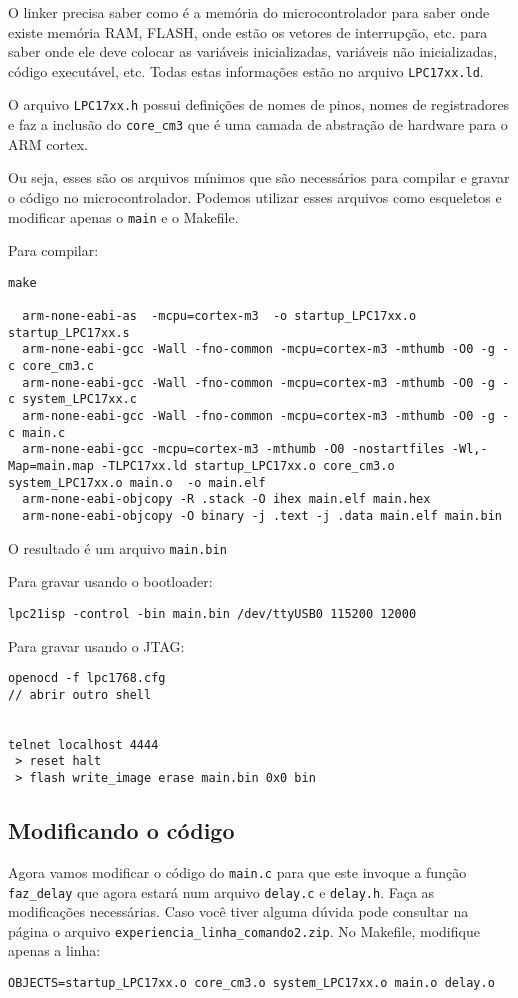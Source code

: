 \documentclass[a4paper,10pt]{article}
\begin{document}
O linker precisa saber como é a memória do microcontrolador para saber onde existe memória RAM, FLASH, onde estão os vetores de interrupção, etc. para saber onde ele deve colocar as variáveis inicializadas, variáveis não inicializadas, código executável, etc.  Todas estas informações estão no arquivo \verb|LPC17xx.ld|.



O arquivo \verb|LPC17xx.h| possui definições de nomes de pinos, nomes de registradores e faz a inclusão do \verb|core_cm3| que é uma camada de abstração de hardware para o ARM cortex.


Ou seja, esses são os arquivos mínimos que são necessários para compilar e gravar o código no microcontrolador. Podemos utilizar esses arquivos como esqueletos e modificar apenas o \verb|main| e o Makefile.

Para compilar:
\begin{lstlisting}
make

  arm-none-eabi-as  -mcpu=cortex-m3  -o startup_LPC17xx.o startup_LPC17xx.s
  arm-none-eabi-gcc -Wall -fno-common -mcpu=cortex-m3 -mthumb -O0 -g -c core_cm3.c
  arm-none-eabi-gcc -Wall -fno-common -mcpu=cortex-m3 -mthumb -O0 -g -c system_LPC17xx.c
  arm-none-eabi-gcc -Wall -fno-common -mcpu=cortex-m3 -mthumb -O0 -g -c main.c
  arm-none-eabi-gcc -mcpu=cortex-m3 -mthumb -O0 -nostartfiles -Wl,-Map=main.map -TLPC17xx.ld startup_LPC17xx.o core_cm3.o system_LPC17xx.o main.o  -o main.elf
  arm-none-eabi-objcopy -R .stack -O ihex main.elf main.hex
  arm-none-eabi-objcopy -O binary -j .text -j .data main.elf main.bin
\end{lstlisting}

O resultado é um arquivo \verb|main.bin|



Para gravar usando o bootloader:
\begin{lstlisting}
lpc21isp -control -bin main.bin /dev/ttyUSB0 115200 12000
\end{lstlisting}

Para gravar usando o JTAG:
\begin{lstlisting}
openocd -f lpc1768.cfg
// abrir outro shell


telnet localhost 4444
 > reset halt
 > flash write_image erase main.bin 0x0 bin
 \end{lstlisting}

\subsection{Modificando o código}

Agora vamos modificar o código do \verb|main.c| para que este invoque a função \verb|faz_delay| que agora estará num arquivo \verb|delay.c| e \verb|delay.h|. Faça as modificações necessárias. Caso você tiver alguma dúvida pode consultar na página o arquivo \verb|experiencia_linha_comando2.zip|. No Makefile, modifique apenas a linha:

\begin{lstlisting}
OBJECTS=startup_LPC17xx.o core_cm3.o system_LPC17xx.o main.o delay.o
\end{lstlisting}
\end{document}
